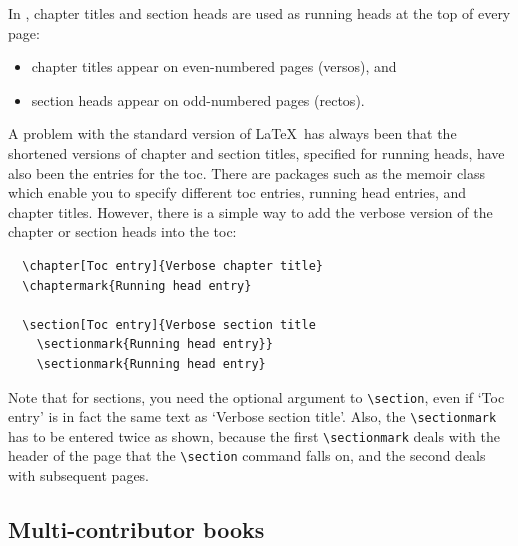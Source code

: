 In \cambridge, chapter titles and section heads are used as running heads at the top of every page:
\begin{itemize}
\item chapter titles appear on even-numbered pages (versos), and
\item section heads appear on odd-numbered pages (rectos).
\end{itemize}
A problem with the standard version of \LaTeX\ has always been that the shortened versions of chapter and section titles, specified for running heads, have also been the entries for the toc. There are packages such as the memoir class which enable you to specify different toc entries, running head entries, and chapter titles. However, there is a simple way to add the verbose version of the chapter or section heads into the toc:
\begin{verbatim}
  \chapter[Toc entry]{Verbose chapter title}
  \chaptermark{Running head entry}

  \section[Toc entry]{Verbose section title
    \sectionmark{Running head entry}}
    \sectionmark{Running head entry}
\end{verbatim}
Note that for sections, you need the optional argument to \verb"\section", even if `Toc entry' is in fact the same text as `Verbose section title'. Also, the \verb"\sectionmark" has to be entered twice as shown, because the first \verb"\sectionmark" deals with the header of the page that the \verb"\section" command falls on, and the second deals with subsequent pages.

\subsection{Multi-contributor books}
\label{multicontributor}

